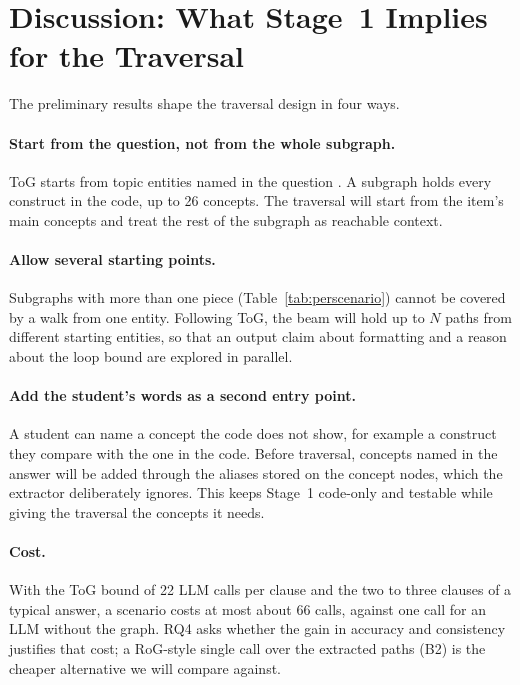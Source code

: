 \documentclass[sigconf,nonacm]{acmart}
\begin{document}
\section{Discussion: What Stage~1 Implies for the Traversal}
\label{sec:discussion}
The preliminary results shape the traversal design in four ways.

\paragraph{Start from the question, not from the whole subgraph.} ToG starts from topic entities named in the question
\cite{sun2024tog}. A subgraph holds every construct in the code, up to 26 concepts. The traversal will start from the
item's main concepts and treat the rest of the subgraph as reachable context.

\paragraph{Allow several starting points.} Subgraphs with more than one piece (Table~\ref{tab:perscenario}) cannot be
covered by a walk from one entity. Following ToG, the beam will hold up to $N$ paths from different starting entities,
so that an output claim about formatting and a reason about the loop bound are explored in parallel.

\paragraph{Add the student's words as a second entry point.} A student can name a concept the code does not show,
for example a construct they compare with the one in the code. Before traversal, concepts named in the answer will be added through the aliases
stored on the concept nodes, which the extractor deliberately ignores. This keeps Stage~1 code-only and testable while
giving the traversal the concepts it needs.

\paragraph{Cost.} With the ToG bound of 22 LLM calls per clause and the two to three clauses of a typical answer, a
scenario costs at most about 66 calls, against one call for an LLM without the graph. RQ4 asks whether the gain in
accuracy and consistency justifies that cost; a RoG-style single call over the extracted paths (B2) is the cheaper
alternative we will compare against.
\end{document}
